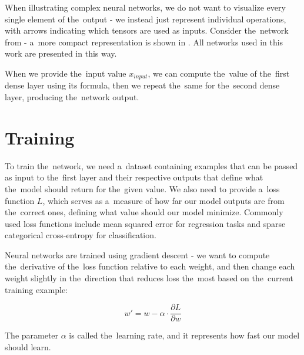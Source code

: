
When illustrating complex neural networks, we do not want to visualize every single element of the~output - we instead just represent individual operations, with arrows indicating which tensors are used as inputs. Consider the~network from  - a~more compact representation is shown in . All networks used in this work are presented in this way.




When we provide the~input value $x_{input}$, we can compute the~value of the~first dense layer using its formula, then we repeat the~same for the~second dense layer, producing the~network output.

\section{Training}

To train the~network, we need a~dataset containing examples that can be passed as input to the~first layer and their respective outputs that define what the~model should return for the~given value. We also need to provide a~loss function $L$, which serves as a~measure of how far our model outputs are from the~correct ones, defining what value should our model minimize. Commonly used loss functions include mean squared error for regression tasks and sparse categorical cross-entropy for classification.

Neural networks are trained using gradient descent - we want to compute the~derivative of the~loss function relative to each weight, and then change each weight slightly in the~direction that reduces loss the~most based on the~current training example:

$$w' = w - \alpha \cdot \frac{\partial L}{\partial w}$$

The parameter $\alpha$ is called the~learning rate, and it represents how fast our model should learn.

